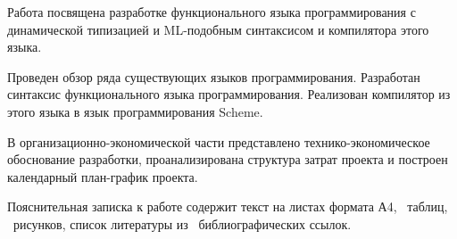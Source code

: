 \summarytitle

Работа посвящена разработке функционального языка программирования с динамической типизацией и ML-подобным синтаксисом и компилятора этого языка.

Проведен обзор ряда существующих языков программирования.
Разработан синтаксис функционального языка программирования.
Реализован компилятор из этого языка в язык программирования Scheme.

В организационно-экономической части представлено технико-экономическое обоснование разработки, проанализирована структура затрат проекта и построен календарный план-график проекта.

Пояснительная записка к работе содержит текст на \pageref{LastPage} листах формата А4, \tottab~таблиц, \totfig~рисунков, список литературы из \totbibref~библиографических ссылок.
